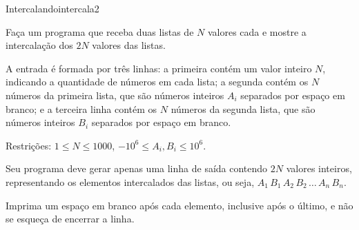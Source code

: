 \documentclass[12pt,a4paper,oneside]{article}
\begin{document}
\begin{problem}{Intercalando}{intercala}{2}
 
Faça um programa que receba duas listas de $N$ valores cada e mostre a intercalação dos $2N$ valores das listas.

%

\InputFile

A entrada é formada por três linhas: a primeira contém um valor inteiro $N$, indicando a quantidade de números em cada lista; a segunda contém os $N$ números da primeira lista, que são números inteiros $A_i$ separados por espaço em branco; e a terceira linha contém os $N$ números da segunda lista, que são números inteiros $B_i$ separados por espaço em branco.

Restrições: $1 \leq N \leq 1000$, $-10^6 \leq A_i, B_i \leq 10^6$.



\OutputFile

Seu programa deve gerar apenas uma linha de saída contendo $2N$ valores inteiros, representando os elementos intercalados das listas, ou seja, $A_1 \,B_1\, A_2\, B_2\, \dots\, A_n\, B_n$.

Imprima um espaço em branco após cada elemento, inclusive após o último, e não se esqueça de encerrar a linha.


\Example

\begin{example}
%
\end{example}

\begin{example}
%
\end{example}


\end{problem}
\end{document}
